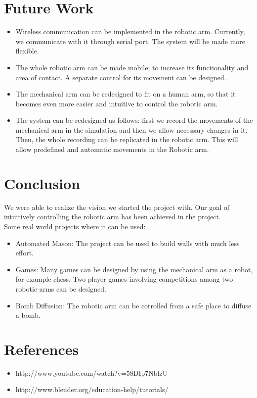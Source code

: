 \documentclass[a4wide]{article}
\begin{document}
\section{Future Work}
\begin{itemize}
\item Wireless communication can be implemented in the robotic arm. Currently, we communicate with it through serial port. The system will be made more flexible.
\item The whole robotic arm can be made mobile; to increase its functionality and area of contact. A separate control for its movement can be designed.
\item The mechanical arm can be redesigned to fit on a human arm, so that it becomes even more easier and intuitive to control the robotic arm.
\item The system can be redesigned as follows: first we record the movements of the mechanical arm in the simulation and then we allow necessary changes in it. Then, the whole recording can be replicated in the robotic arm. This will allow predefined and automatic movements in the Robotic arm.
\end{itemize}
\section{Conclusion}
We were able to realize the vision we started the project with. Our goal of intuitively controlling the robotic arm has been achieved in the project.\\

Some real world projects where it can be used: 
\begin{itemize}
\item Automated Mason: The project can be used to build walls with much less effort.
\item Games: Many games can be designed by using the mechanical arm as a robot, for example chess. Two player games involving competitions among two robotic arms can be designed.
\item Bomb Diffusion: The robotic arm can be cotrolled from a safe place to diffuse a bomb.
\end{itemize}
\newpage
\section{References}
\begin{itemize}
\item http://www.youtube.com/watch?v=58DIp7NblzU
\item http://www.blender.org/education-help/tutorials/
\end{itemize}
\end{document}

